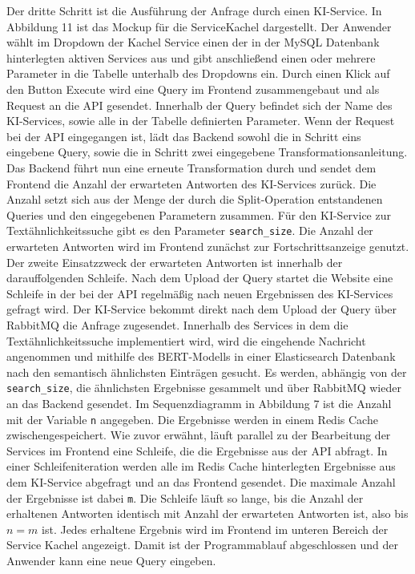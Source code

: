 Der dritte Schritt ist die Ausführung der Anfrage durch einen KI-Service. In Abbildung 11 ist das Mockup für die \glqq Service\grqq Kachel dargestellt. Der Anwender  wählt im Dropdown der Kachel \glqq Service\grqq{} einen der in der MySQL Datenbank hinterlegten aktiven Services aus und gibt anschließend einen oder mehrere Parameter in die Tabelle unterhalb des Dropdowns ein. Durch einen Klick auf den Button \glqq Execute\grqq{} wird eine Query im Frontend zusammengebaut und als Request an die API gesendet. Innerhalb der Query befindet sich der Name des KI-Services, sowie alle in der Tabelle definierten Parameter. Wenn der Request bei der API eingegangen ist, lädt das Backend sowohl die in Schritt eins eingebene Query, sowie die in Schritt zwei eingegebene Transformationsanleitung. Das Backend führt nun eine erneute Transformation durch und sendet dem Frontend die Anzahl der erwarteten Antworten des KI-Services zurück. Die Anzahl setzt sich aus der Menge der durch die Split-Operation entstandenen Queries und den eingegebenen Parametern zusammen. Für den KI-Service zur Textähnlichkeitssuche gibt es den Parameter \texttt{search\_{}size}. Die Anzahl der erwarteten Antworten wird im Frontend zunächst zur Fortschrittsanzeige genutzt. Der zweite Einsatzzweck der erwarteten Antworten ist innerhalb der darauffolgenden Schleife. Nach dem Upload der Query startet die Website eine Schleife in der bei der API regelmäßig nach neuen Ergebnissen des KI-Services gefragt wird. Der KI-Service bekommt direkt nach dem Upload der Query über RabbitMQ die Anfrage zugesendet. Innerhalb des Services in dem die Textähnlichkeitssuche  implementiert wird, wird die eingehende Nachricht angenommen und mithilfe des BERT-Modells in einer Elasticsearch Datenbank nach den semantisch ähnlichsten Einträgen gesucht. Es werden, abhängig von der \texttt{search\_{}size}, die ähnlichsten Ergebnisse gesammelt und über RabbitMQ wieder an das Backend gesendet. Im Sequenzdiagramm in Abbildung 7 ist die Anzahl mit der Variable \texttt{n} angegeben. Die Ergebnisse werden in einem Redis Cache zwischengespeichert. Wie zuvor erwähnt, läuft parallel zu der Bearbeitung der Services im Frontend eine Schleife, die die Ergebnisse aus der API abfragt. In einer Schleifeniteration werden alle im Redis Cache hinterlegten Ergebnisse aus dem KI-Service abgefragt und an das Frontend gesendet. Die maximale Anzahl der Ergebnisse ist dabei \texttt{m}. Die Schleife läuft so lange, bis die Anzahl der erhaltenen Antworten identisch mit Anzahl der erwarteten Antworten ist, also bis $n=m$ ist. Jedes erhaltene Ergebnis wird im Frontend im unteren Bereich der \glqq Service\grqq{} Kachel angezeigt. Damit ist der Programmablauf abgeschlossen und der Anwender kann eine neue Query eingeben.

